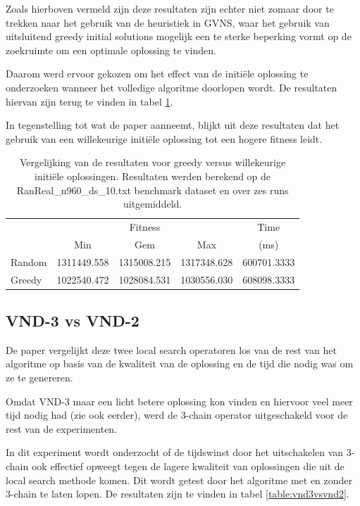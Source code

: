 \documentclass[pdftex,12pt,a4paper]{article}
\begin{document}
Zoals hierboven vermeld zijn deze resultaten zijn echter niet zomaar door te trekken naar het gebruik van de heuristiek in GVNS, waar het gebruik van uitsluitend greedy initial solutions mogelijk een te sterke beperking vormt op de zoekruimte om een optimale oplossing te vinden.

Daarom werd ervoor gekozen om het effect van de initi\"ele oplossing te onderzoeken wanneer het volledige algoritme doorlopen wordt. De resultaten hiervan zijn terug te vinden in tabel \ref{table:greedyvsrandom}.

In tegenstelling tot wat de paper aanneemt, blijkt uit deze resultaten dat het gebruik van een willekeurige initi\"ele oplossing tot een hogere fitness leidt.

\begin{table}
\centering
\begin{tabular}{l|c|c|c|c}
& \multicolumn{3}{c|}{Fitness} & Time\\
& Min & Gem & Max & (ms) \\\hline
Random & 1311449.558 &	1315008.215 &	1317348.628 &	600701.3333\\
Greedy & 1022540.472 & 1028084.531 &	1030556.030 &	608098.3333
\end{tabular}
\caption{Vergelijking van de resultaten voor greedy versus willekeurige initi\"ele oplossingen. Resultaten werden berekend op de  RanReal\_n960\_ds\_10.txt benchmark dataset en over zes runs uitgemiddeld.}
\label{table:greedyvsrandom}
\end{table}

\subsection{VND-3 vs VND-2}
De paper vergelijkt deze twee local search operatoren los van de rest van het algoritme op basis van de kwaliteit van de oplossing en de tijd die nodig was om ze te genereren.

Omdat VND-3 maar een licht betere oplossing kon vinden en hiervoor veel meer tijd nodig had (zie ook eerder), werd de 3-chain operator uitgeschakeld voor de rest van de experimenten.

In dit experiment wordt onderzocht of de tijdswinst door het uitschakelen van 3-chain ook effectief opweegt tegen de lagere kwaliteit van oplossingen die uit de local search methode komen.
Dit wordt getest door het algoritme met en zonder 3-chain te laten lopen. De resultaten zijn te vinden in tabel \ref{table:vnd3vsvnd2}.
\end{document}
